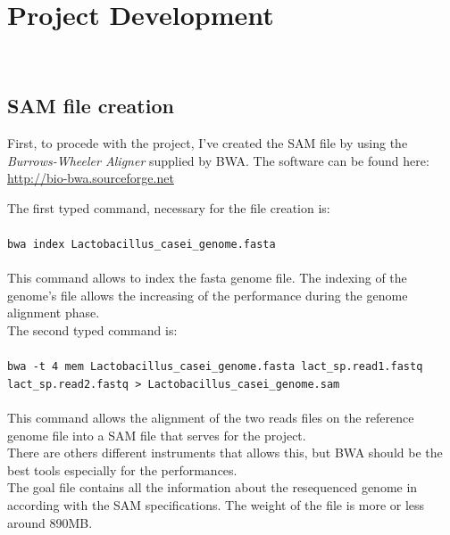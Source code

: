 
\chapter{Project Development}
\label{cap:project-development}

\\

\section{SAM file creation}
First, to procede with the project, I've created the SAM file by using the \emph{Burrows-Wheeler Aligner} supplied by BWA.
The software can be found here: \href{http://bio-bwa.sourceforge.net}{http://bio-bwa.sourceforge.net}

The first typed command, necessary for the file creation is:
\\
\\
\verb|bwa index Lactobacillus_casei_genome.fasta|
\\
\\
This command allows to index the fasta genome file. The indexing of the genome's file allows the increasing of the performance during the genome alignment phase.\\

The second typed command is:
\\
\\
\verb|bwa -t 4 mem Lactobacillus_casei_genome.fasta lact_sp.read1.fastq lact_sp.read2.fastq > Lactobacillus_casei_genome.sam|
\\
\\
This command allows the alignment of the two reads files on the reference genome file into a SAM file that serves for the project.\\

There are others different instruments that allows this, but BWA should be the best tools especially for the performances.\\

The goal file contains all the information about the resequenced genome in according with the SAM specifications.
The weight of the file is more or less around 890MB.
\newpage

